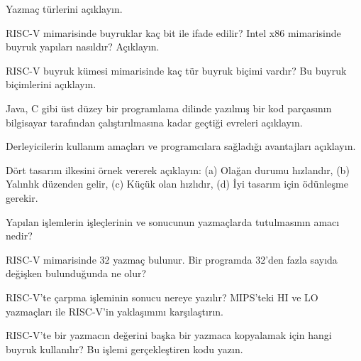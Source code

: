 \begin{alistirma}[\kolay]
Yazmaç türlerini açıklayın.
\end{alistirma}

\begin{alistirma}[\orta]
RISC-V mimarisinde buyruklar kaç bit ile ifade edilir? Intel x86 mimarisinde buyruk yapıları nasıldır? Açıklayın.
\end{alistirma}

\begin{alistirma}[\orta]
RISC-V buyruk kümesi mimarisinde kaç tür buyruk biçimi vardır? Bu buyruk biçimlerini açıklayın.
\end{alistirma}

\begin{alistirma}[\kolay]
Java, C gibi üst düzey bir programlama dilinde yazılmış bir kod parçasının bilgisayar tarafından çalıştırılmasına kadar geçtiği evreleri açıklayın.
\end{alistirma}

\begin{alistirma}[\kolay]
Derleyicilerin kullanım amaçları ve programcılara sağladığı avantajları açıklayın.
\end{alistirma}

\begin{alistirma}[\orta]
Dört tasarım ilkesini örnek vererek açıklayın: (a) Olağan durumu hızlandır, (b) Yalınlık düzenden gelir, (c) Küçük olan hızlıdır, (d) İyi tasarım için ödünleşme gerekir.
\end{alistirma}

\begin{alistirma}[\kolay]
Yapılan işlemlerin işleçlerinin ve sonucunun yazmaçlarda tutulmasının amacı nedir?
\end{alistirma}

\begin{alistirma}[\orta]
RISC-V mimarisinde 32 yazmaç bulunur. Bir programda 32'den fazla sayıda değişken bulunduğunda ne olur?
\end{alistirma}

\begin{alistirma}[\orta]
RISC-V'te çarpma işleminin sonucu nereye yazılır? MIPS'teki HI ve LO yazmaçları ile RISC-V'in yaklaşımını karşılaştırın.
\end{alistirma}

\begin{alistirma}[\kolay]
RISC-V'te bir yazmacın değerini başka bir yazmaca kopyalamak için hangi buyruk kullanılır? Bu işlemi gerçekleştiren kodu yazın.
\end{alistirma}

